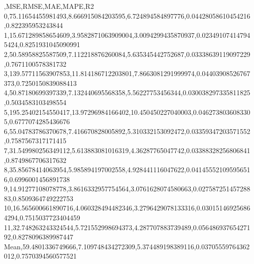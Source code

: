 ,MSE,RMSE,MAE,MAPE,R2
0,75.11654455981493,8.666915084203595,6.724894584897776,0.04428058610454216,0.822395953243844
1,15.671289858654609,3.9582871063909004,3.0094299435870937,0.023491074147945424,0.8251931045090991
2,50.58958825587509,7.112218876260084,5.635345442752687,0.03338639119097229,0.7671100578381732
3,139.57711563907853,11.814186712203801,7.8663081291999974,0.04403908526767373,0.7250150839088413
4,50.87180699397339,7.132440695568358,5.56227753456344,0.030038297335811825,0.5034583103498554
5,195.25402154550417,13.97296984166402,10.450450227040003,0.0462738036083305,0.6777074285436676
6,55.04783786370678,7.416670828005892,5.310332153092472,0.03359347203571552,0.7587567317171415
7,31.549980256349112,5.613883081016319,4.36287765047742,0.03388328256806841,0.8749867706317632
8,35.85678414063954,5.985894197002558,4.928441116047622,0.041455521095956516,0.6996001456891738
9,14.91277108078778,3.8616332957754564,3.0761628074580663,0.02758725145728883,0.8509364749222753
10,16.565600661890716,4.060328494482346,3.2796429078133316,0.030151469256864294,0.7515037723404459
11,32.748263243324544,5.721552998694373,4.287707883739489,0.05648693765427192,0.8278096389987447
Mean,59.4801336749666,7.109748434272309,5.374489198389116,0.03705559764362012,0.7570394560577521
